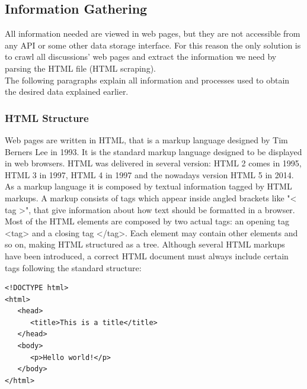 \subsection{Information Gathering}

All information needed are viewed in web pages, but they are not accessible from any API or some other data storage interface. For this reason the only solution is to crawl all discussions' web pages and extract the information we need by parsing the \ac{HTML} file (\ac{HTML} scraping). \\
The following paragraphs explain all information and processes used to obtain the desired data explained earlier.

\subsubsection{HTML Structure}

Web pages are written in \ac{HTML}, that is a markup language designed by Tim Berners Lee in 1993. It is the standard markup language designed to be displayed in web browsers. HTML was delivered in several version: \ac{HTML} 2 comes in 1995, \ac{HTML} 3 in 1997, \ac{HTML} 4 in 1997 and the nowadays version HTML 5 in 2014. \\
As a markup language it is composed by textual information tagged by \ac{HTML} markups. A markup consists of tags which appear inside angled brackets  like "< tag >", that give information about how text should be formatted in a browser.	Most of the \ac{HTML} elements are composed by two actual tags: an opening tag <tag> and a closing tag </tag>. Each element may contain other elements and so on, making \ac{HTML} structured as a tree. Although several HTML markups have been introduced, a correct HTML document must always include certain tags following the standard structure:

\begin{center}
\begin{lstlisting}
<!DOCTYPE html>
<html>
   <head>
      <title>This is a title</title>
   </head>
   <body>
      <p>Hello world!</p>
   </body>
</html>
\end{lstlisting}
\end{center}

